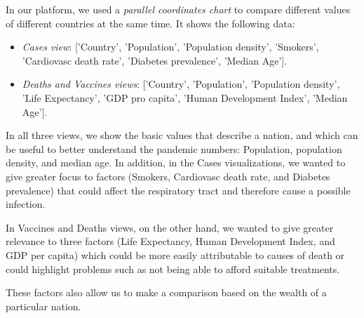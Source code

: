 \documentclass[10pt,conference]{IEEEtran}
\begin{document}
In our platform, we used a {\em parallel coordinates chart} to compare different values of different countries at the same time. 
It shows the following data:
\begin{itemize}
 \item {\em Cases view}: ['Country', 'Population', 'Population density', 'Smokers', 'Cardiovasc death rate', 'Diabetes prevalence', 'Median Age']. 
 \item {\em Deaths and Vaccines views}: ['Country', 'Population', 'Population density', 'Life Expectancy', 'GDP pro capita', 'Human Development Index', 'Median Age']. 
\end{itemize}

In all three views, we show the basic values that describe a nation, and which can be useful to better understand the pandemic numbers: Population, population density, and median age. In addition, in the Cases visualizations, we wanted to give greater focus to factors (Smokers, Cardiovasc death rate, and Diabetes prevalence) that could affect the respiratory tract and therefore cause a possible infection.

In Vaccines and Deaths views, on the other hand, we wanted to give greater relevance to three factors (Life Expectancy, Human Development Index, and GDP per capita) which could be more easily attributable to causes of death or could highlight problems such as not being able to afford suitable treatments.

These factors also allow us to make a comparison based on the wealth of a particular nation.

\begin{figure}
\end{figure}
\end{document}
